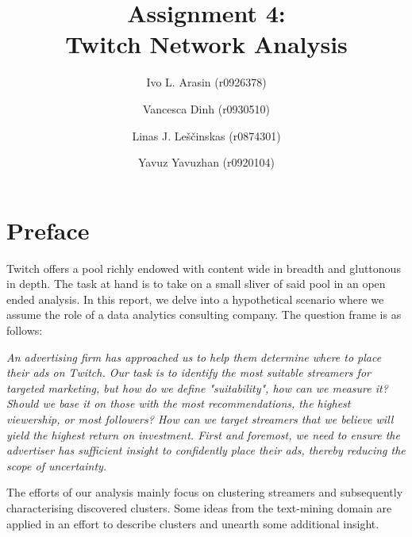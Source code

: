 \documentclass[11pt, oneside]{article}   	%
\title{Assignment 4: \\ Twitch Network Analysis}
\author{\centering Ivo L. Arasin (r0926378) \and Vancesca Dinh (r0930510) \and Linas J. Leščinskas (r0874301) \and Yavuz Yavuzhan (r0920104)}
\begin{document}
\maketitle
\section{Preface}
Twitch offers a pool richly endowed with content wide in breadth and gluttonous in depth. The task at hand is to take on a small sliver of said pool in an open ended analysis. In this report, we delve into a hypothetical scenario where we assume the role of a data analytics consulting company. The question frame is as follows: 
\begin{center}
\begin{displayquote}
\itshape %
An advertising firm has approached us to help them determine where to place their ads on Twitch. Our task is to identify the most suitable streamers for targeted marketing, but how do we define "suitability", how can we measure it? Should we base it on those with the most recommendations, the highest viewership, or most followers? How can we target streamers that we believe will yield the highest return on investment. First and foremost, we need to ensure the advertiser has sufficient insight to confidently place their ads, thereby reducing the scope of uncertainty.
\end{displayquote}
\end{center}

The efforts of our analysis mainly focus on clustering streamers and subsequently characterising discovered clusters. Some ideas from the text-mining domain are applied in an effort to describe clusters and unearth some additional insight.
\end{document}
